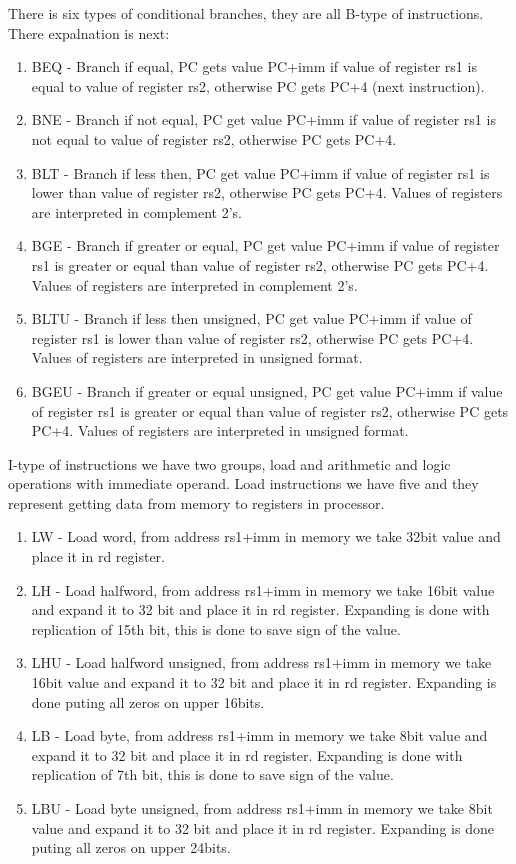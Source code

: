 \documentclass{scrreprt}
\begin{document}
    \hfill \break
    There is six types of conditional branches, they are all B-type of instructions. There expalnation is next:
    \begin{enumerate}
        \item BEQ - Branch if equal, PC gets value PC+imm if value of register rs1 is equal to value of register rs2, otherwise PC gets PC+4 (next instruction). 
        \item BNE - Branch if not equal, PC get value PC+imm if value of register rs1 is not equal to value of register rs2, otherwise PC gets PC+4. 
        \item BLT - Branch if less then, PC get value PC+imm if value of register rs1 is lower than value of register rs2, otherwise PC gets PC+4. Values of registers are interpreted in complement 2's.
        \item BGE - Branch if greater or equal, PC get value PC+imm if value of register rs1 is greater or equal than value of register rs2, otherwise PC gets PC+4. Values of registers are interpreted in complement 2's. 
        \item BLTU - Branch if less then unsigned, PC get value PC+imm if value of register rs1 is lower than value of register rs2, otherwise PC gets PC+4. Values of registers are interpreted in unsigned format. 
        \item BGEU - Branch if greater or equal unsigned, PC get value PC+imm if value of register rs1 is greater or equal than value of register rs2, otherwise PC gets PC+4. Values of registers are interpreted in unsigned format.
    \end{enumerate}

    I-type of instructions we have two groups, load and arithmetic and logic operations with immediate operand. Load instructions we have five and they represent getting data from memory to registers in processor. 
    \hfill \break
    \begin{enumerate}
        \item LW - Load word, from address rs1+imm in memory we take 32bit value and place it in rd register.
        \item LH - Load halfword, from address rs1+imm in memory we take 16bit value and expand it to 32 bit and place it in rd register. Expanding is done with replication of 15th bit, this is done to save sign of the value.
        \item LHU - Load halfword unsigned, from address rs1+imm in memory we take 16bit value and expand it to 32 bit and place it in rd register. Expanding is done puting all zeros on upper 16bits.
        \item LB - Load byte, from address rs1+imm in memory we take 8bit value and expand it to 32 bit and place it in rd register. Expanding is done with replication of 7th bit, this is done to save sign of the value. 
        \item LBU - Load byte unsigned, from address rs1+imm in memory we take 8bit value and expand it to 32 bit and place it in rd register. Expanding is done puting all zeros on upper 24bits. 
    \end{enumerate}
\end{document}
